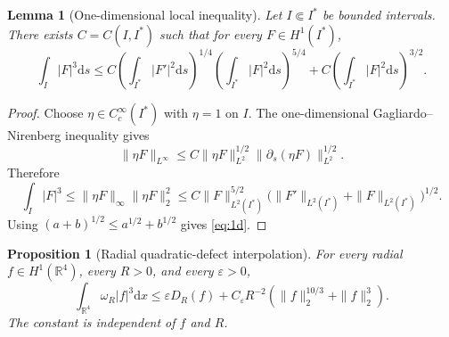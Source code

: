 \documentclass[10pt,a4paper]{amsart}
\numberwithin{equation}{section}
\newtheorem{proposition}[theorem]{Proposition}
\newtheorem{lemma}[theorem]{Lemma}
\newcommand{\R}{\mathbb{R}}
\newcommand{\dd}{\mathrm{d}x}
\newcommand{\dds}{\mathrm{d}s}
\begin{document}
\begin{lemma}[One-dimensional local inequality]\label{lem:1d}
Let $I\Subset I^*$ be bounded intervals.  There exists $C=C(I,I^*)$ such that for every $F\in H^1(I^*)$,
\begin{equation}\label{eq:1d}
 \int_I|F|^3\dds
 \le C\left(\int_{I^*}|F'|^2\dds\right)^{1/4}
 \left(\int_{I^*}|F|^2\dds\right)^{5/4}
 +C\left(\int_{I^*}|F|^2\dds\right)^{3/2}.
\end{equation}
\end{lemma}

\begin{proof}
Choose $\eta\in C_c^\infty(I^*)$ with $\eta=1$ on $I$.  The one-dimensional Gagliardo--Nirenberg inequality gives
\[
 \|\eta F\|_{L^\infty} \le C\|\eta F\|_{L^2}^{1/2}\|\partial_s(\eta F)\|_{L^2}^{1/2}.
\]
Therefore
\[
 \int_I|F|^3
 \le \|\eta F\|_\infty\|\eta F\|_2^2
 \le C\|F\|_{L^2(I^*)}^{5/2}
 \big(\|F'\|_{L^2(I^*)}+\|F\|_{L^2(I^*)}\big)^{1/2}.
\]
Using $(a+b)^{1/2}\le a^{1/2}+b^{1/2}$ gives \eqref{eq:1d}.
\end{proof}

\begin{proposition}[Radial quadratic-defect interpolation]\label{prop:weighted}
For every radial $f\in H^1(\R^4)$, every $R>0$, and every $\varepsilon>0$,
\begin{equation}\label{eq:weighted-main}
 \int_{\R^4}\omega_R|f|^3\dd
 \le \varepsilon D_R(f) +C_\varepsilon R^{-2}\left(\|f\|_2^{10/3}+\|f\|_2^3\right).
\end{equation}
The constant is independent of $f$ and $R$.
\end{proposition}
\end{document}
